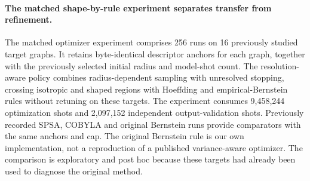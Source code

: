 \paragraph{The matched shape-by-rule experiment separates transfer from refinement.}
The matched optimizer experiment comprises 256 runs on 16 previously studied target graphs. It retains byte-identical descriptor anchors for each graph, together with the previously selected initial radius and model-shot count. The resolution-aware policy combines radius-dependent sampling with unresolved stopping, crossing isotropic and shaped regions with Hoeffding and empirical-Bernstein rules without retuning on these targets. The experiment consumes 9,458,244 optimization shots and 2,097,152 independent output-validation shots. Previously recorded SPSA, COBYLA and original Bernstein runs provide comparators with the same anchors and cap. The original Bernstein rule is our own implementation, not a reproduction of a published variance-aware optimizer. The comparison is exploratory and post hoc because these targets had already been used to diagnose the original method.
